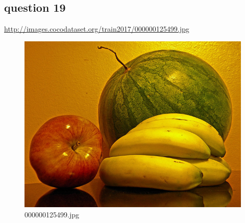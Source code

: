\subsection*{question 19}
\url{http://images.cocodataset.org/train2017/000000125499.jpg}
    \begin{figure}[h]
        \centering
        \includegraphics[width=0.8\linewidth]{../image set/easy/000000125499.jpg}
        \caption{000000125499.jpg}
    \end{figure}
